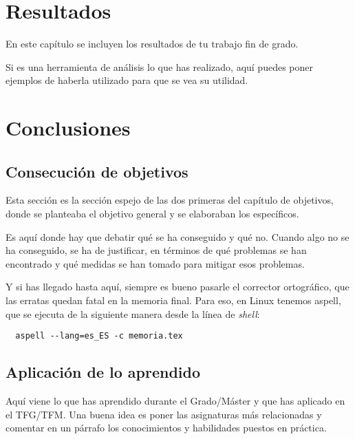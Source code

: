 \documentclass[a4paper, 12pt]{book}
\begin{document}
\cleardoublepage
\chapter{Resultados}
\label{chap:resultados}

En este capítulo se incluyen los resultados de tu trabajo fin de grado.

Si es una herramienta de análisis lo que has realizado, aquí puedes poner ejemplos de haberla utilizado para que se vea su utilidad.



\cleardoublepage
\chapter{Conclusiones}
\label{chap:conclusiones}


\section{Consecución de objetivos}
\label{sec:consecucion-objetivos}

Esta sección es la sección espejo de las dos primeras del capítulo de objetivos, donde se planteaba el objetivo general y se elaboraban los específicos.

Es aquí donde hay que debatir qué se ha conseguido y qué no. 
Cuando algo no se ha conseguido, se ha de justificar, en términos de qué problemas se han encontrado y qué medidas se han tomado para mitigar esos problemas.

Y si has llegado hasta aquí, siempre es bueno pasarle el corrector ortográfico, que las erratas quedan fatal en la memoria final.
Para eso, en Linux tenemos aspell, que se ejecuta de la siguiente manera desde la línea de \emph{shell}:

\begin{verbatim}
  aspell --lang=es_ES -c memoria.tex
\end{verbatim}

\section{Aplicación de lo aprendido}
\label{sec:aplicacion}

Aquí viene lo que has aprendido durante el Grado/Máster y que has aplicado en el TFG/TFM.
Una buena idea es poner las asignaturas más relacionadas y comentar en un párrafo los conocimientos y habilidades puestos en práctica.
\end{document}
